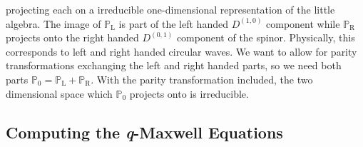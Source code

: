 \documentclass[12pt,a4paper]{article}
\newcommand{\Proj}{\mathbb{P}}
\begin{document}
projecting each on a irreducible one-dimensional representation of the
little algebra. The image of $\Proj_\mathrm{L}$ is part of the left
handed $D^{(1,0)}$ component while $\Proj_\mathrm{R}$ projects onto
the right handed $D^{(0,1)}$ component of the spinor. Physically, this
corresponds to left and right handed circular waves. We want to allow
for parity transformations exchanging the left and right handed parts,
so we need both parts $\Proj_0 = \Proj_\mathrm{L} + \Proj_\mathrm{R}$.
With the parity transformation included, the two dimensional space
which $\Proj_0$ projects onto is irreducible.


\subsection{Computing the \textit{q}-Maxwell Equations}
\end{document}
